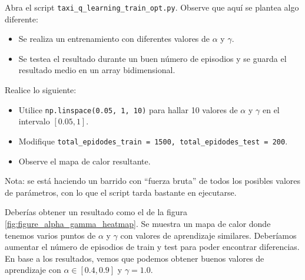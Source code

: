 \documentclass{article}
\begin{document}
\begin{exercise}
Abra el script \texttt{taxi\_q\_learning\_train\_opt.py}. Observe que aquí se plantea algo diferente: 
\begin{itemize}
    \item Se realiza un entrenamiento con diferentes valores de $\alpha$ y $\gamma$.
    \item Se testea el resultado durante un buen número de episodios y se guarda el resultado medio en un array bidimensional.
\end{itemize}

Realice lo siguiente:
\begin{itemize}
    \item Utilice \texttt{np.linspace(0.05, 1, 10)} para hallar 10 valores de $\alpha$ y $\gamma$ en el intervalo $[0.05, 1]$.
    \item Modifique \texttt{total\_epidodes\_train = 1500, total\_epidodes\_test = 200}.
    \item Observe el mapa de calor resultante.
\end{itemize}
Nota: se está haciendo un barrido con ``fuerza bruta'' de todos los posibles valores de parámetros, con lo que el script tarda bastante en ejecutarse.
\end{exercise}

Deberías obtener un resultado como el de la figura \ref{fig:figure_alpha_gamma_heatmap}. Se muestra un mapa de calor donde tenemos varios puntos de $\alpha$ y $\gamma$ con valores de aprendizaje similares. Deberíamos aumentar el número de episodios de train y test para poder encontrar diferencias. En base a los resultados, vemos que podemos obtener buenos valores de aprendizaje con $\alpha \in [0.4, 0.9]$ y $\gamma=1.0$.



\end{document}

